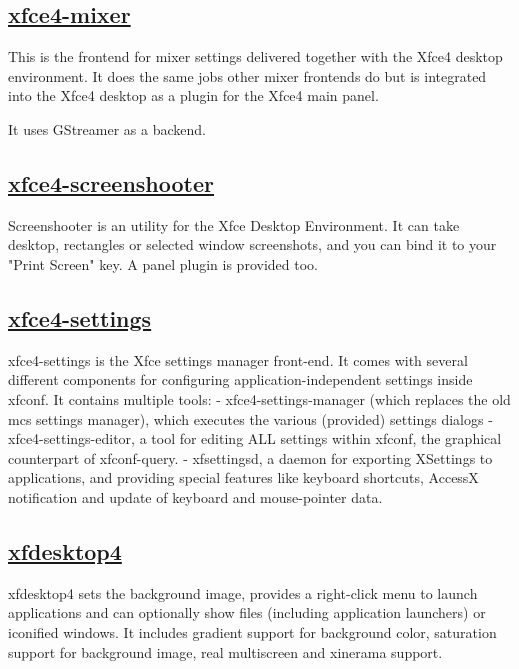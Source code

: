 \subsection{\href{http://www.xfce.org/}{xfce4-mixer}}

 This is the frontend for mixer settings delivered together
 with the Xfce4 desktop environment. It does the same jobs
 other mixer frontends do but is integrated into the Xfce4
 desktop as a plugin for the Xfce4 main panel.
 
 It uses GStreamer as a backend.

\subsection{\href{http://goodies.xfce.org/projects/applications/xfce4-screenshooter}{xfce4-screenshooter}}

 Screenshooter is an utility for the Xfce Desktop Environment. It can take
 desktop, rectangles or selected window screenshots, and you can bind it to
 your "Print Screen" key. A panel plugin is provided too.

\subsection{\href{http://www.xfce.org}{xfce4-settings}}

 xfce4-settings is the Xfce settings manager front-end. It comes
 with several different components for configuring application-independent
 settings inside xfconf.
 It contains multiple tools:
  - xfce4-settings-manager (which replaces the old mcs settings manager),
    which executes the various (provided) settings dialogs
  - xfce4-settings-editor, a tool for editing ALL settings within xfconf, the
    graphical counterpart of xfconf-query.
  - xfsettingsd, a daemon for exporting XSettings to applications, and
    providing special features like keyboard shortcuts, AccessX notification
    and update of keyboard and mouse-pointer data.

\subsection{\href{http://www.xfce.org/}{xfdesktop4}}

 xfdesktop4 sets the background image, provides a right-click menu to
 launch applications and can optionally show files (including application
 launchers) or iconified windows. It includes gradient support for
 background color, saturation support for background image, real multiscreen
 and xinerama support.

